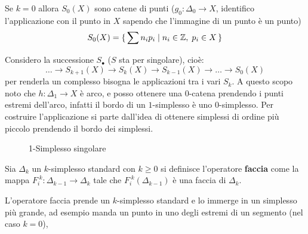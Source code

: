 
\begin{example}[$ k = 0$]
  Se $ k = 0 $ allora $ S_0(X) $ sono catene di punti ($ g_0 : \Delta_0 \to X $,
  identifico l'applicazione con il punto in $ X $ sapendo che l'immagine di un
  punto è un punto)
  \[
    S_0(X) = \set { \sum n_i p_i | n_i \in \mathbb{Z}, \; p_i \in X}
  \]
\end{example}
Considero la successione $ S_\bullet $ ($ S $ sta per singolare), cioè:
\[
  \dots \to S_{k+1}(X) \to S_k(X) \to S_{k-1}(X) \to \dots \to S_0(X)
\]
per renderla un complesso bisogna le applicazioni tra i vari $ S_k $. A questo
scopo noto che $ h: \Delta_1 \to X $ è arco, e posso ottenere una $ 0 $-catena
prendendo i punti estremi dell'arco, infatti il bordo di un $ 1 $-simplesso è
uno $ 0 $-simplesso. Per costruire l'applicazione si parte dall'idea di ottenere
simplessi di ordine più piccolo prendendo il bordo dei simplessi.

\begin{figure}[htbp]
  \centering
  \caption{1-Simplesso singolare}
  \label{fig:lez1:1_standard_simplex_with_arc}
\end{figure}

\begin{definition}
  Sia $ \Delta_k $ un $ k $-simplesso standard con $ k \geq 0 $ si definisce l'operatore
  \textbf{faccia} come la mappa
  $ F_i^{\;k}: \Delta_{k-1} \to \Delta_k $ tale che $ F_i^{\;k}(\Delta_{k-1}) $ è una faccia di
  $ \Delta_k $.
\end{definition}
L'operatore faccia prende un $ k $-simplesso standard e lo immerge in un
simplesso più grande, ad esempio manda un punto in uno degli estremi di un
segmento (nel caso $ k = 0 $),

